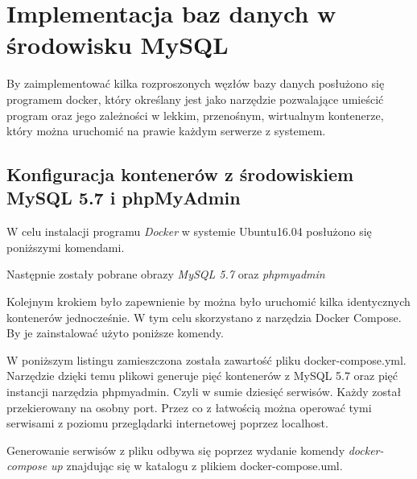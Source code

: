 \chapter{Implementacja baz danych w środowisku MySQL}

By zaimplementować kilka rozproszonych węzłów bazy danych posłużono się programem docker, który określany jest jako narzędzie pozwalające umieścić program oraz jego zależności w lekkim, przenośnym, wirtualnym kontenerze, który można uruchomić na prawie każdym serwerze z systemem. 

\section{Konfiguracja kontenerów z środowiskiem MySQL 5.7 i phpMyAdmin}
W celu instalacji programu \textit{Docker} w systemie Ubuntu16.04 posłużono się poniższymi komendami.

\lssetdef


Następnie zostały pobrane obrazy \textit{MySQL 5.7} oraz \textit{phpmyadmin}

\lssetdef


Kolejnym krokiem było zapewnienie by można było uruchomić kilka identycznych kontenerów jednocześnie. W tym celu skorzystano z narzędzia Docker Compose. By je zainstalować użyto poniższe komendy.

\lssetdef


W poniższym listingu zamieszczona została zawartość pliku docker-compose.yml. Narzędzie dzięki temu plikowi generuje pięć kontenerów z MySQL 5.7 oraz pięć instancji narzędzia phpmyadmin. Czyli w sumie dziesięć serwisów. Każdy został przekierowany na osobny port. Przez co z łatwością można operować tymi serwisami z poziomu przeglądarki internetowej poprzez localhost.

\lssetdef


Generowanie serwisów z pliku odbywa się poprzez wydanie komendy \textit{docker-compose up} znajdując się w katalogu z plikiem docker-compose.uml.

